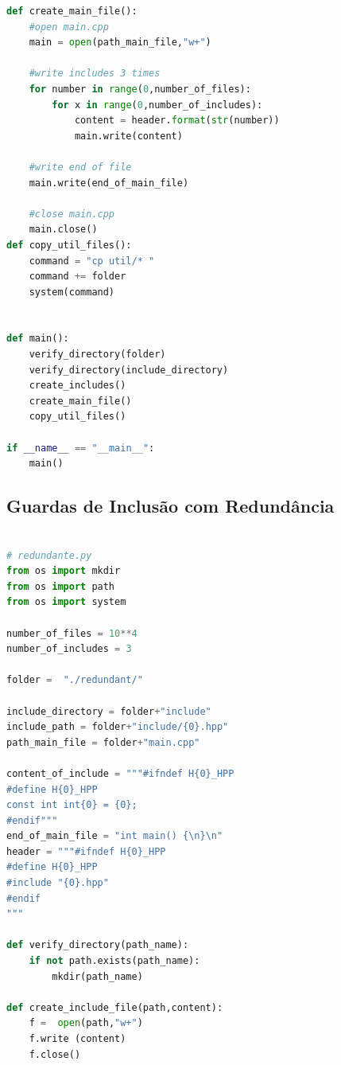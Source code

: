 \begin{apendicesenv}
\begin{lstlisting}[language=Python, caption={
                     Script Pragma Once},
             label=script_pragma_once_include]
def create_main_file():
    #open main.cpp
    main = open(path_main_file,"w+")

    #write includes 3 times
    for number in range(0,number_of_files):
        for x in range(0,number_of_includes):
            content = header.format(str(number))
            main.write(content)

    #write end of file
    main.write(end_of_main_file)

    #close main.cpp
    main.close()
def copy_util_files():                                                           
    command = "cp util/* "                                                       
    command += folder                                                            
    system(command)                                                              
                      

def main():
    verify_directory(folder)
    verify_directory(include_directory)
    create_includes()
    create_main_file()
    copy_util_files()

if __name__ == "__main__":
    main()
\end{lstlisting}

\subsection{Guardas de Inclusão com Redundância}
\begin{lstlisting}[language=Python,caption={
     Script Redundância de Guardas de Inclusão},
                 label=script_redundante_include]
                 
# redundante.py
from os import mkdir
from os import path
from os import system

number_of_files = 10**4
number_of_includes = 3

folder =  "./redundant/"

include_directory = folder+"include"
include_path = folder+"include/{0}.hpp"
path_main_file = folder+"main.cpp"

content_of_include = """#ifndef H{0}_HPP
#define H{0}_HPP
const int int{0} = {0};
#endif"""
end_of_main_file = "int main() {\n}\n"
header = """#ifndef H{0}_HPP
#define H{0}_HPP
#include "{0}.hpp"
#endif
"""

def verify_directory(path_name):
    if not path.exists(path_name):
        mkdir(path_name)

def create_include_file(path,content):
    f =  open(path,"w+")
    f.write (content)
    f.close()


\end{lstlisting}
\end{apendicesenv}
